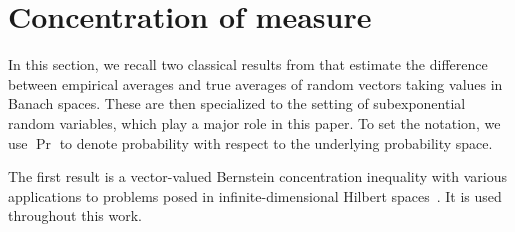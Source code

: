 \documentclass{article}
\theoremstyle{plain}
\theoremstyle{my_def}
\theoremstyle{my_rem}
\numberwithin{equation}{section}
\numberwithin{theorem}{section}%
\begin{document}
\appendix 

\section{Concentration of measure}\label{app:concen}
In this section, we recall two classical results from \cite{pinelis1986remarks} that estimate the difference between empirical averages and true averages of random vectors taking values in Banach spaces. These are then specialized to the setting of subexponential random variables, which play a major role in this paper. To set the notation, we use $\Pr$ to denote probability with respect to the underlying probability space.

The first result is a vector-valued Bernstein concentration inequality with various applications to problems posed in infinite-dimensional Hilbert spaces~\cite{caponnetto2007optimal,maurer2021concentration,rudi2017generalization}. It is used throughout this work.
\end{document}
